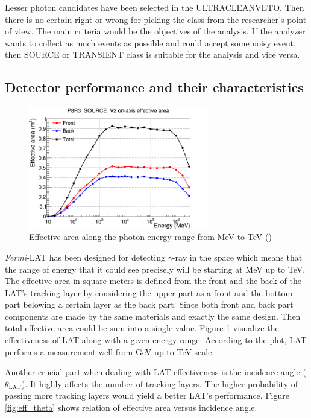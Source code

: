 Lesser photon candidates have been selected in the ULTRACLEANVETO. Then there is no certain right or wrong for
picking the class from the researcher's point of view. The main criteria would be the objectives of the analysis. If the analyzer wants to collect as much events as possible and could accept some noisy event, then SOURCE or 
TRANSIENT class is suitable for the analysis and vice versa.


\subsection{Detector performance and their characteristics}

\begin{figure}[h!]
    \centering
    \includegraphics[width=0.7\textwidth]{content/background/figures/eff_energy.png}
    \caption{
        Effective area along the photon energy range from MeV to TeV
        (\cite{lat_p8_performance})
    }
    \label{fig:eff_energy}
\end{figure}

\textit{Fermi}-LAT has been designed for detecting $\gamma$-ray in the 
space which means that the range of energy that it could see precisely 
will be starting at MeV up to TeV. The effective area in square-meters
is defined from the front and the back of the LAT's tracking layer 
by considering the upper part as a front and the bottom part belowing 
a certain layer as the back part. Since both front and back part components are made by the same materials and exactly the same design. 
Then total effective area could be sum into a single value. 
Figure \ref{fig:eff_energy} visualize the effectiveness of LAT 
along with a given energy range. According to the plot, LAT performs 
a measurement well from GeV up to TeV scale.


Another crucial part when dealing with LAT effectiveness is the incidence angle ($\theta_\text{LAT}$). It highly affects the number of tracking layers. The higher probability of passing more tracking layers would yield a better LAT's performance. Figure 
\ref{fig:eff_theta} shows relation of effective area versus 
incidence angle.


